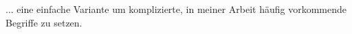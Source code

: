 
... eine einfache Variante um komplizierte, in meiner Arbeit häufig vorkommende Begriffe zu setzen. 
